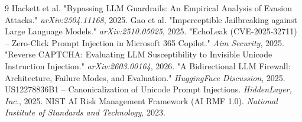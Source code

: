 \documentclass[10pt,a4paper]{article}
\begin{document}
\begin{thebibliography}{9}
 Hackett et al. "Bypassing LLM Guardrails: An Empirical Analysis of Evasion Attacks." \emph{arXiv:2504.11168}, 2025.
 Gao et al. "Imperceptible Jailbreaking against Large Language Models." \emph{arXiv:2510.05025}, 2025.
 "EchoLeak (CVE-2025-32711) -- Zero-Click Prompt Injection in Microsoft 365 Copilot." \emph{Aim Security}, 2025.
 "Reverse CAPTCHA: Evaluating LLM Susceptibility to Invisible Unicode Instruction Injection." \emph{arXiv:2603.00164}, 2026.
 "A Bidirectional LLM Firewall: Architecture, Failure Modes, and Evaluation." \emph{HuggingFace Discussion}, 2025.
 US12278836B1 -- Canonicalization of Unicode Prompt Injections. \emph{HiddenLayer, Inc.}, 2025.
 NIST AI Risk Management Framework (AI RMF 1.0). \emph{National Institute of Standards and Technology}, 2023.
\end{thebibliography}
\end{document}
